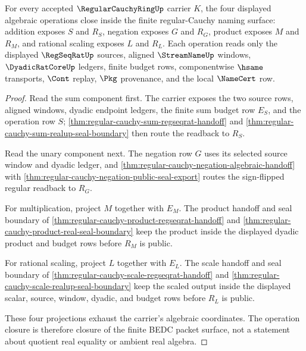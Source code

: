 \begin{theorem}
\label{thm:regular-cauchy-ring-operation-closure}
For every accepted $\RegularCauchyRingUp$ carrier $K$, the four displayed algebraic operations close inside the finite regular-Cauchy naming surface: addition exposes $S$ and $R_S$, negation exposes $G$ and $R_G$, product exposes $M$ and $R_M$, and rational scaling exposes $L$ and $R_L$. Each operation reads only the displayed $\RegSeqRatUp$ sources, aligned $\StreamNameUp$ windows, $\DyadicRatCoreUp$ ledgers, finite budget rows, componentwise $\hsame$ transports, $\Cont$ replay, $\Pkg$ provenance, and the local $\NameCert$ row.
\end{theorem}
\begin{proof}
Read the sum component first. The carrier exposes the two source rows, aligned windows, dyadic endpoint ledgers, the finite sum budget row $E_S$, and the operation row $S$; \autoref{thm:regular-cauchy-sum-regseqrat-handoff} and \autoref{thm:regular-cauchy-sum-realup-seal-boundary} then route the readback to $R_S$.

Read the unary component next. The negation row $G$ uses its selected source window and dyadic ledger, and \autoref{thm:regular-cauchy-negation-algebraic-handoff} with \autoref{thm:regular-cauchy-negation-public-seal-export} routes the sign-flipped regular readback to $R_G$.

For multiplication, project $M$ together with $E_M$. The product handoff and seal boundary of \autoref{thm:regular-cauchy-product-regseqrat-handoff} and \autoref{thm:regular-cauchy-product-real-seal-boundary} keep the product inside the displayed dyadic product and budget rows before $R_M$ is public.

For rational scaling, project $L$ together with $E_L$. The scale handoff and seal boundary of \autoref{thm:regular-cauchy-scale-regseqrat-handoff} and \autoref{thm:regular-cauchy-scale-realup-seal-boundary} keep the scaled output inside the displayed scalar, source, window, dyadic, and budget rows before $R_L$ is public.

These four projections exhaust the carrier's algebraic coordinates. The operation closure is therefore closure of the finite BEDC packet surface, not a statement about quotient real equality or ambient real algebra.
\end{proof}

